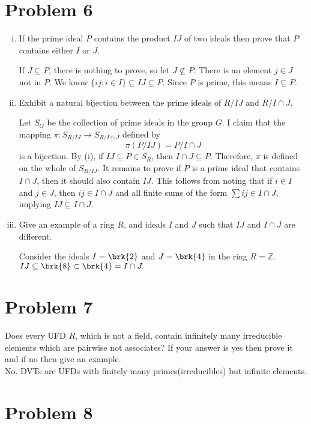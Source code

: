 \documentclass[12pt]{article}
\begin{document}
\section*{Problem 6}
\begin{enumerate}[(i)]
    \item If the prime ideal $P$ contains the product $IJ$ of two ideals then prove that $P$ contains either $I$ or $J$.
    
    If $J \subseteq P$, there is nothing to prove, so let $J \nsubseteq P$. There is an element $j \in J$ not in $P$. We know $\{ij : i \in I\} \subseteq IJ \subseteq P$. Since $P$ is prime, this means $I \subseteq P.$ 
    \item Exhibit a natural bijection between the prime ideals of $R/IJ$ and $R/I \cap J$.

    Let $S_G$ be the collection of prime ideals in the group $G$. I claim that the mapping $\pi: S_{R/IJ} \to S_{R/I\cap J}$ defined by
    $$\pi(P/IJ) = P/I\cap J$$
    is a bijection. By (i), if $IJ \subseteq P \in S_{R}$, then $I \cap J \subseteq P.$ Therefore, $\pi$ is defined on the whole of $S_{R/IJ}.$ It remains to prove if $P$ is a prime ideal that contains $I \cap J$, then it should also contain $IJ$. This follows from noting that if $i \in I$ and $j \in J$, then $ij \in I \cap J$ and all finite sums of the form $\sum ij \in I \cap J$, implying $IJ \subseteq I \cap J$.
    \item Give an example of a ring $R$, and ideals $I$ and $J$ such that $IJ$ and $I \cap J$ are different.

    Consider the ideals $I =  \brk{2}$ and $J = \brk{4}$ in the ring $R = \mathbb{Z}.$ $IJ \subseteq \brk{8} \subset \brk{4} = I \cap J.$
\end{enumerate}

\section*{Problem 7}

Does every UFD $R$, which is not a field, contain infinitely many irreducible elements which are pairwise not associates? If your answer is yes then prove it and if no then give an example.\\ 


No. DVTs are UFDs with finitely many primes(irreducibles) but infinite elements. 

\section*{Problem 8}
\end{document}
